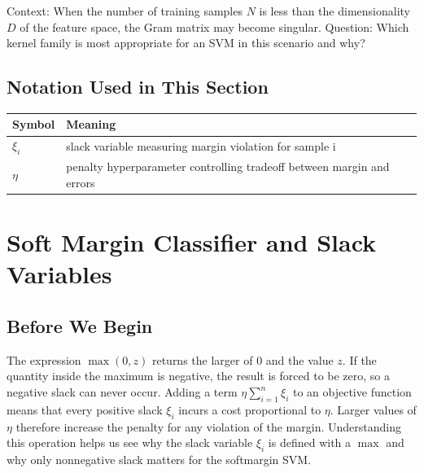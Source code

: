 \documentclass[12pt, a4paper]{article}
\begin{document}
\begin{question}
Context: When the number of training samples \(N\) is less than the dimensionality \(D\) of the feature space, the Gram matrix may become singular.  
Question: Which kernel family is most appropriate for an SVM in this scenario and why?  
\end{question}

\newpage

\newpage

\subsection*{Notation Used in This Section}
\begin{tabular}{@{}ll@{}}
\toprule
Symbol & Meaning \\ \midrule
    $\xi_i$ & slack variable measuring margin violation for sample i \\
    $\eta$ & penalty hyperparameter controlling tradeoff between margin and errors \\
\bottomrule
\end{tabular}
\vspace{1em}

\section{Soft Margin Classifier and Slack Variables}

\subsection{Before We Begin}  
The expression \(\max(0,z)\) returns the larger of \(0\) and the value \(z\).  
If the quantity inside the maximum is negative, the result is forced to be zero, so a negative slack can never occur.  
Adding a term \(\eta\sum_{i=1}^{n}\xi_i\) to an objective function means that every positive slack \(\xi_i\) incurs a cost proportional to \(\eta\).  
Larger values of \(\eta\) therefore increase the penalty for any violation of the margin.  
Understanding this operation helps us see why the slack variable \(\xi_i\) is defined with a \(\max\) and why only nonnegative slack matters for the softmargin SVM.
\end{document}
